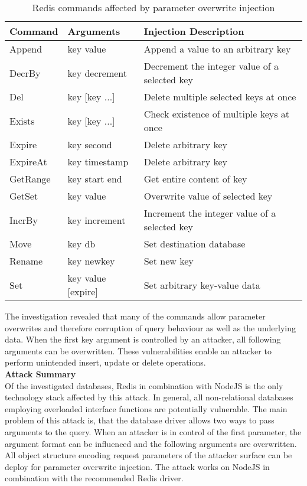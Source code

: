 \begin{table}[h]
 \sffamily
 \centering
 \begin{tabular}{lll}
  \textbf{Command} & \textbf{Arguments} & \textbf{Injection Description} \\ \hline
  Append  & key value       & Append a value to an arbitrary key\\
  DecrBy  & key decrement   & Decrement the integer value of a selected key \\
  Del     & key [key ...]   & Delete multiple selected keys at once \\
  Exists  & key [key ...]   & Check existence of multiple keys at once \\
  Expire  & key second      & Delete arbitrary key \\
  ExpireAt& key timestamp & Delete arbitrary key \\
  GetRange& key start end & Get entire content of key \\
  GetSet  & key value & Overwrite value of selected key \\
  IncrBy  & key increment & Increment the integer value of a selected key \\
  Move    & key db & Set destination database \\
  Rename  & key newkey & Set new key \\
  Set     & key value [expire] & Set arbitrary key-value data \\
  \bottomrule 
 \end{tabular}
 \caption{Redis commands affected by parameter overwrite injection}
 \label{tab:redis_commands_affected}
\end{table}

The investigation revealed that many of the commands allow parameter overwrites and therefore corruption of query behaviour as well as the underlying data. When the first key argument is controlled by an attacker, all following arguments can be overwritten. These vulnerabilities enable an attacker to perform unintended insert, update or delete operations. \\

\textbf{Attack Summary} \\
Of the investigated databases, Redis in combination with NodeJS is the only technology stack affected by this attack. In general, all non-relational databases employing overloaded interface functions are potentially vulnerable. The main problem of this attack is, that the database driver allows two ways to pass arguments to the query. When an attacker is in control of the first parameter, the argument format can be influenced and the following arguments are overwritten. All object structure encoding request parameters of the attacker surface can be deploy for parameter overwrite injection. The attack works on NodeJS in combination with the recommended Redis driver. 

